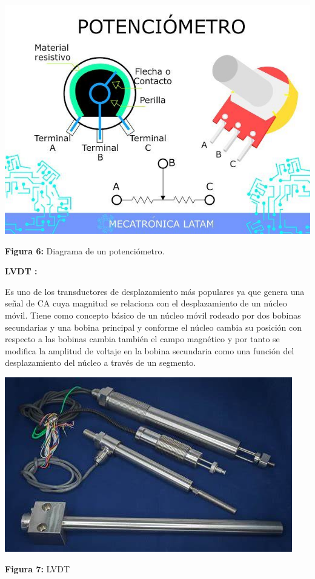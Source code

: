 \vspace{5mm} %

\begin{center}
	\includegraphics[width=0.4\linewidth]{img/Spotenciometro}
	
	\vspace{2mm} %
	
	\textbf{Figura 6:} Diagrama de un potenciómetro.
\end{center}

\vspace{10mm}
\textbf{LVDT :} 

Es uno de los transductores de desplazamiento más populares ya que genera una señal de CA cuya magnitud se relaciona con el desplazamiento de un núcleo móvil. Tiene como concepto básico de un núcleo móvil rodeado por dos bobinas secundarias y una bobina principal y conforme el núcleo cambia su posición con respecto a las bobinas cambia también el campo magnético y por tanto se modifica la amplitud de voltaje en la bobina secundaria como una función del desplazamiento del núcleo a través de un segmento.

\vspace{5mm}

\begin{center}
	\includegraphics[width=0.3\linewidth]{img/LVDT}
	
	\vspace{2mm} %
	
	\textbf{Figura 7:} LVDT
\end{center}

\vspace{5mm} %

